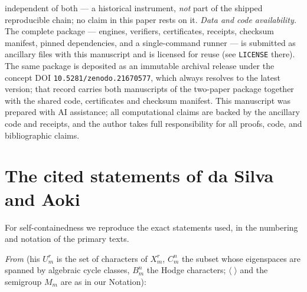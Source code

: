 \documentclass[11pt]{amsart}
\theoremstyle{remark}
\begin{document}
independent of both --- a historical instrument, \emph{not} part of the shipped reproducible
chain; no claim in this paper rests on it. \emph{Data and code availability.} The complete package --- engines, verifiers, certificates,
receipts, checksum manifest, pinned dependencies, and a single-command runner --- is submitted
as ancillary files with this manuscript and is licensed for reuse (see \texttt{LICENSE} there).
The same package is deposited as an immutable archival release under the concept DOI
\texttt{10.5281/zenodo.21670577}, which always resolves to the latest version; that record
carries both manuscripts of the two-paper package together with the shared code, certificates
and checksum manifest. This
manuscript was prepared with AI assistance; all computational claims are backed by the
ancillary code and receipts, and the author takes full responsibility for all proofs, code, and
bibliographic claims.

\appendix
\section{The cited statements of da Silva and Aoki}\label{app:aoki}

For self-containedness we reproduce the exact statements used, in the numbering and notation of
the primary texts.

\emph{From \cite{daSilva}} (his $U^r_m$ is the set of characters of $X^r_m$, $C^n_m$ the
subset whose eigenspaces are spanned by algebraic cycle classes, $B^n_m$ the Hodge characters;
$\langle\;\rangle$ and the semigroup $M_m$ are as in our Notation):
\end{document}
